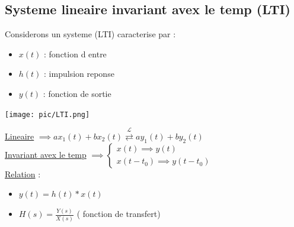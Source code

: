 \documentclass[12pt]{book}
\newcommand{\lagrange}{\mathcal{L}}
\begin{document}
            \subsection{Systeme lineaire invariant avex le temp (LTI)}
               \begin{center}
                    \begin{minipage}{0.49\linewidth}
                        Considerons un systeme (LTI) caracterise par :
                        \begin{itemize}
                            \item $x(t) $ : fonction d entre 
                            \item $h(t) $ : impulsion reponse 
                            \item $y(t) $ : fonction de sortie
                        \end{itemize}
                    \end{minipage}
                    \begin{minipage}{0.49\linewidth}
                        
                        \texttt{[image: pic/LTI.png]}
                    \end{minipage}
               \end{center}
                \underline{Lineaire} $\implies ax_1(t) + bx_2(t)\overset{\lagrange}{\rightleftarrows}ay_1(t) + by_2(t)$ \\
                \underline{Invariant avex le temp} $\implies \begin{cases}
                    x(t) \implies y(t) \\x(t-t_0) \implies y(t-t_0)
                \end{cases}$ \\
                \underline{Relation} :\begin{itemize}
                    \item $y(t) = h(t)*x(t)$
                    \item $H(s) = \frac{Y(s)}{X(s)}$ ( fonction de transfert)
                \end{itemize}
\end{document}
